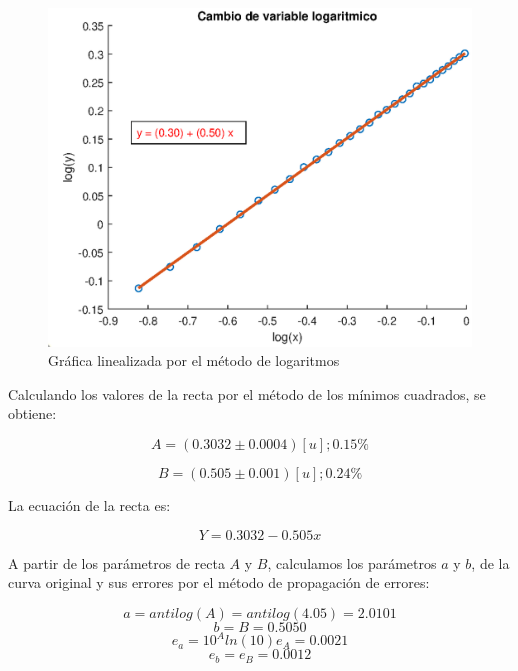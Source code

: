 \documentclass[letter,11pt]{article}
\begin{document}
\begin{figure}[!h]
\centering
\includegraphics[scale=1.00]{resources/3.4.2.eps}
\caption{Gráfica linealizada por el método de logaritmos}
\label{practica44_2}
\end{figure}

Calculando los valores de la recta por el método de los mínimos cuadrados, se
obtiene:

\begin{equation}
    A = (0.3032 \pm 0.0004)[u];0.15\%
\end{equation}

\begin{equation}
    B = (0.505 \pm 0.001)[u];0.24\%
\end{equation}

La ecuación de la recta es:

\begin{equation}
    Y = 0.3032 - 0.505 x
\end{equation}

A partir de los parámetros de recta $A$ y $B$, calculamos los parámetros $a$ y
$b$, de la curva original y sus errores por el método de propagación de errores:

\begin{equation*}
    a = antilog(A) = antilog(4.05) = 2.0101
\end{equation*}
\begin{equation*}
    b = B = 0.5050
\end{equation*}
\begin{equation*}
    e_a = 10^A ln(10) e_A = 0.0021
\end{equation*}
\begin{equation*}
    e_b = e_B = 0.0012
\end{equation*}
\end{document}
